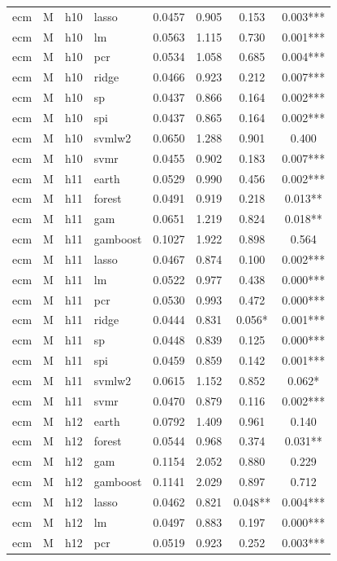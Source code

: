 \begin{ThreePartTable}
\begin{longtable}[t]{llclcccc}
ecm & M & h10 & lasso & 0.0457 & 0.905 & 0.153 & 0.003***\\
ecm & M & h10 & lm & 0.0563 & 1.115 & 0.730 & 0.001***\\
ecm & M & h10 & pcr & 0.0534 & 1.058 & 0.685 & 0.004***\\
ecm & M & h10 & ridge & 0.0466 & 0.923 & 0.212 & 0.007***\\
ecm & M & h10 & sp & 0.0437 & 0.866 & 0.164 & 0.002***\\
ecm & M & h10 & spi & 0.0437 & 0.865 & 0.164 & 0.002***\\
ecm & M & h10 & svmlw2 & 0.0650 & 1.288 & 0.901 & 0.400\\
ecm & M & h10 & svmr & 0.0455 & 0.902 & 0.183 & 0.007***\\
\addlinespace
ecm & M & h11 & earth & 0.0529 & 0.990 & 0.456 & 0.002***\\
ecm & M & h11 & forest & 0.0491 & 0.919 & 0.218 & 0.013**\\
ecm & M & h11 & gam & 0.0651 & 1.219 & 0.824 & 0.018**\\
ecm & M & h11 & gamboost & 0.1027 & 1.922 & 0.898 & 0.564\\
ecm & M & h11 & lasso & 0.0467 & 0.874 & 0.100 & 0.002***\\
ecm & M & h11 & lm & 0.0522 & 0.977 & 0.438 & 0.000***\\
ecm & M & h11 & pcr & 0.0530 & 0.993 & 0.472 & 0.000***\\
ecm & M & h11 & ridge & 0.0444 & 0.831 & 0.056* & 0.001***\\
ecm & M & h11 & sp & 0.0448 & 0.839 & 0.125 & 0.000***\\
ecm & M & h11 & spi & 0.0459 & 0.859 & 0.142 & 0.001***\\
ecm & M & h11 & svmlw2 & 0.0615 & 1.152 & 0.852 & 0.062*\\
ecm & M & h11 & svmr & 0.0470 & 0.879 & 0.116 & 0.002***\\
\addlinespace
ecm & M & h12 & earth & 0.0792 & 1.409 & 0.961 & 0.140\\
ecm & M & h12 & forest & 0.0544 & 0.968 & 0.374 & 0.031**\\
ecm & M & h12 & gam & 0.1154 & 2.052 & 0.880 & 0.229\\
ecm & M & h12 & gamboost & 0.1141 & 2.029 & 0.897 & 0.712\\
ecm & M & h12 & lasso & 0.0462 & 0.821 & 0.048** & 0.004***\\
ecm & M & h12 & lm & 0.0497 & 0.883 & 0.197 & 0.000***\\
ecm & M & h12 & pcr & 0.0519 & 0.923 & 0.252 & 0.003***\\

\end{longtable}
\end{ThreePartTable}
